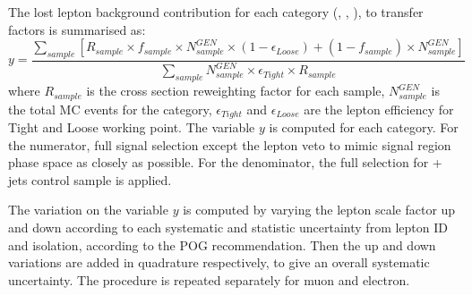 The lost lepton background contribution for each category (\njet, \nb, \scalht), to 
transfer factors is summarised as:
\begin{equation}
    \label{eq:lostLepTF}
    y = \frac{\sum_{sample} [ R_{sample} \times f_{sample} \times N^{GEN}_{sample} \times ( 1 - \epsilon_{Loose} ) + ( 1 - f_{sample} ) \times N^{GEN}_{sample} ]}{ \sum_{sample} N^{GEN}_{sample} \times \epsilon_{Tight} \times R_{sample} }
\end{equation}
where $R_{sample}$ is the cross section reweighting factor for each sample, 
$N^{GEN}_{sample}$ is the total MC events for the category, $\epsilon_{Tight}$
and $\epsilon_{Loose}$ are the lepton efficiency for Tight and Loose working 
point. The variable $y$ is computed for each category. For the numerator, full
signal selection except the lepton veto to mimic signal region phase space as
closely as possible. For the denominator, the full selection for \mj + jets 
control sample is applied.

The variation on the variable $y$ is computed by varying the lepton scale factor
up and down according to each systematic and statistic uncertainty from lepton
ID and isolation, according to the POG recommendation. Then the up and down 
variations are added in quadrature respectively, to give an overall systematic 
uncertainty. The procedure is repeated separately for muon and electron.

